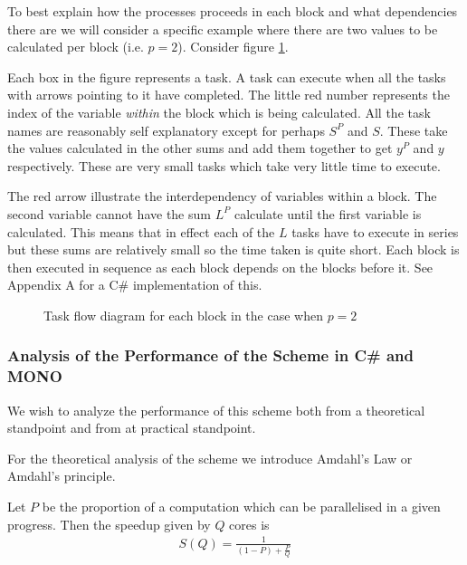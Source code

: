 To best explain how the processes proceeds in each block and what dependencies there are we will consider a specific example where there are two values to be calculated per block (i.e. $ p = 2 $). Consider figure \ref{fig:AMB_Task_Flow}. 

Each box in the figure represents a task. A task can execute when all the tasks with arrows pointing to it have completed. The little red number represents the index of the variable \emph{within} the block which is being calculated. All the task names are reasonably self explanatory except for perhaps $ S^P $ and $ S $. These take the values calculated in the other sums and add them together to get $ y^P $ and $ y $ respectively. These are very small tasks which take very little time to execute.

The red arrow illustrate the interdependency of variables within a block. The second variable cannot have the sum $ L^P $ calculate until the first variable is calculated. This means that in effect each of the $ L $ tasks have to execute in series but these sums are relatively small so the time taken is quite short. Each block is then executed in sequence as each block depends on the blocks before it. See Appendix A for a C\# implementation of this. 

\begin{figure}[H]

\caption{Task flow diagram for each block in the case when $ p = 2 $}
\label{fig:AMB_Task_Flow}
\end{figure}

\subsubsection{Analysis of the Performance of the Scheme in C\# and MONO}

We wish to analyze the performance of this scheme both from a theoretical standpoint and from at practical standpoint. 

For the theoretical analysis of the scheme we introduce Amdahl's Law or Amdahl's principle.
\begin{mdframed}[innertopmargin=10pt]
\begin{principle}[Amdahl]
Let $ P $ be the proportion of a computation which can be parallelised in a given progress. Then the speedup given by
$ Q $ cores is
\begin{align}
	S(Q) = \frac{1}{(1-P)+\frac{P}{Q}}
\end{align}

\end{principle}
\end{mdframed}

